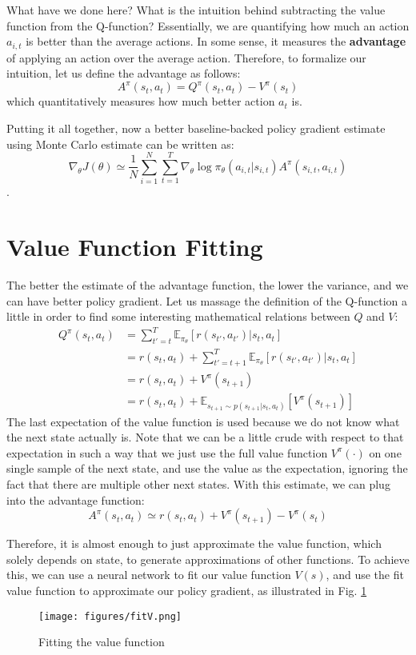 What have we done here? What is the intuition behind subtracting the value function from the Q-function? Essentially, we are quantifying how much an action $a_{i,t}$ is better than the average actions. In some sense, it measures the \textbf{advantage} of applying an action over the average action. Therefore, to formalize our intuition, let us define the advantage as follows:
$$A^\pi(s_t,a_t) = Q^\pi(s_t,a_t) - V^\pi(s_t)$$
which quantitatively measures how much better action $a_t$ is.

Putting it all together, now a better baseline-backed policy gradient estimate using Monte Carlo estimate can be written as:
$$\nabla_\theta J(\theta) \simeq \frac{1}{N}\sum_{i=1}^N\sum_{t=1}^T\nabla_{\theta}\log \pi_\theta (a_{i,t}|s_{i,t})A^\pi(s_{i,t},a_{i,t})$$.

\section{Value Function Fitting}
The better the estimate of the advantage function, the lower the variance, and we can have better policy gradient. Let us massage the definition of the Q-function a little in order to find some interesting mathematical relations between $Q$ and $V$:
\begin{align*}
    Q^\pi(s_t,a_t) &= \sum_{t'=t}^T \mathbb{E}_{\pi_\theta}\left[r(s_{t'},a_{t'})|s_t,a_t\right]\\
    &= r(s_t,a_t)+\sum_{t'=t+1}^T \mathbb{E}_{\pi_\theta}\left[r(s_{t'},a_{t'})|s_t,a_t\right]\\
    &= r(s_t,a_t) + V^\pi(s_{t+1})\\
    &= r(s_t,a_t) + \mathbb{E}_{s_{t+1}\sim p(s_{t+1}|s_t,a_t)}\left[V^\pi(s_{t+1})\right]
\end{align*}
The last expectation of the value function is used because we do not know what the next state actually is. Note that we can be a little crude with respect to that expectation in such a way that we just use the full value function $V^\pi(\cdot)$ on one single sample of the next state, and use the value as the expectation, ignoring the fact that there are multiple other next states. With this estimate, we can plug into the advantage function:
$$A^\pi(s_t,a_t) \simeq r(s_t,a_t) + V^\pi(s_{t+1}) - V^\pi(s_t)$$

Therefore, it is almost enough to just approximate the value function, which solely depends on state, to generate approximations of other functions. To achieve this, we can use a neural network to fit our value function $V(s)$, and use the fit value function to approximate our policy gradient, as illustrated in Fig. \ref{fig:fitV} 
\begin{figure}
    \centering
    \texttt{[image: figures/fitV.png]}
    \caption{Fitting the value function}
    \label{fig:fitV}
\end{figure}

